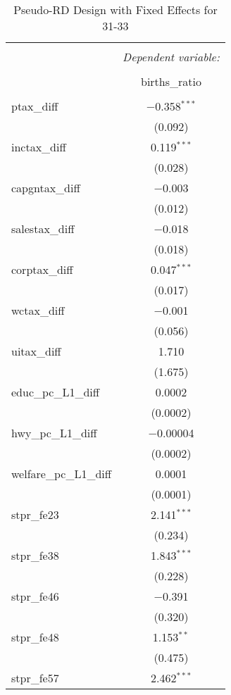 
\begin{table}[!htbp] \centering 
  \caption{Pseudo-RD Design with Fixed Effects for  31-33} 
  \label{} 
\begin{tabular}{@{\extracolsep{5pt}}lc} 
\\[-1.8ex]\hline 
\hline \\[-1.8ex] 
 & \multicolumn{1}{c}{\textit{Dependent variable:}} \\ 
\cline{2-2} 
\\[-1.8ex] & births\_ratio \\ 
\hline \\[-1.8ex] 
 ptax\_diff & $-$0.358$^{***}$ \\ 
  & (0.092) \\ 
  inctax\_diff & 0.119$^{***}$ \\ 
  & (0.028) \\ 
  capgntax\_diff & $-$0.003 \\ 
  & (0.012) \\ 
  salestax\_diff & $-$0.018 \\ 
  & (0.018) \\ 
  corptax\_diff & 0.047$^{***}$ \\ 
  & (0.017) \\ 
  wctax\_diff & $-$0.001 \\ 
  & (0.056) \\ 
  uitax\_diff & 1.710 \\ 
  & (1.675) \\ 
  educ\_pc\_L1\_diff & 0.0002 \\ 
  & (0.0002) \\ 
  hwy\_pc\_L1\_diff & $-$0.00004 \\ 
  & (0.0002) \\ 
  welfare\_pc\_L1\_diff & 0.0001 \\ 
  & (0.0001) \\ 
  stpr\_fe23 & 2.141$^{***}$ \\ 
  & (0.234) \\ 
  stpr\_fe38 & 1.843$^{***}$ \\ 
  & (0.228) \\ 
  stpr\_fe46 & $-$0.391 \\ 
  & (0.320) \\ 
  stpr\_fe48 & 1.153$^{**}$ \\ 
  & (0.475) \\ 
  stpr\_fe57 & 2.462$^{***}$ \\ 

\end{tabular}
\end{table}
